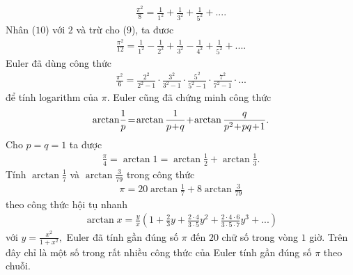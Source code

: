 \begin{multicols}{2}
	\begin{align*}
		\frac{{{\pi ^2}}}{8} = \frac{1}{{{1^2}}} + \frac{1}{{{3^2}}} + \frac{1}{{{5^2}}} + .... \tag{$10$}
	\end{align*}
	Nhân ($10$) với $2$ và trừ cho ($9$), ta đươc
	\begin{align*}
		\frac{{{\pi ^2}}}{{12}} = \frac{1}{{{1^2}}} - \frac{1}{{{2^2}}} + \frac{1}{{{3^2}}} - \frac{1}{{{4^2}}} + \frac{1}{{{5^2}}} + ....
	\end{align*}
	Euler đã dùng công thức
	\begin{align*}
		\frac{\pi^2}{6} = \frac{2^2}{2^2 - 1} \cdot \frac{3^2}{3^2 - 1} \cdot \frac{5^2}{5^2 - 1} \cdot \frac{7^2}{7^2 - 1} \cdot ...
	\end{align*}
	để tính logarithm của $\pi$.
	\vskip 0.1cm  
	Euler cũng đã chứng minh công thức
	\begin{align*}
		{\rm{arctan}}\frac{1}{p}\! =\! \arctan \frac{1}{{p \!+\! q}} \!+\! \arctan \frac{q}{{{p^2} \!+\! pq \!+\! 1}}.
	\end{align*}
	Cho $p = q = 1$ ta được 
	\begin{align*}
		\frac{\pi }{4} = \arctan 1 = \arctan \frac{1}{2} + \arctan \frac{1}{3}.
	\end{align*}
	Tính $\arctan \frac{1}{7}$  và  $\arctan \frac{3}{{79}}$ trong công thức
	\begin{align*}
		\pi  = 20\arctan \frac{1}{7} + 8\arctan \frac{3}{{79}}
	\end{align*}
	theo công thức hội tụ nhanh
	\begin{align*}
		\arctan x \!=\! \frac{y}{x}\left( {1 \!+\! \frac{2}{3}y \!+\! \frac{{2 \!\cdot\! 4}}{{3 \!\cdot\! 5}}{y^2} \!+\! \frac{{2 \!\cdot \!4 \!\cdot\! 6}}{{3 \!\cdot\! 5 \!\cdot\! 7}}{y^3} \!+\! ...} \right)
	\end{align*}
	với $y = \frac{{{x^2}}}{{1 + {x^2}}},$  Euler đã tính gần đúng số $\pi$  đến $20$ chữ số trong vòng $1$ giờ.
	\vskip 0.1cm
	Trên đây chỉ là một số trong rất nhiều công thức của Euler tính gần đúng số $\pi$  theo chuỗi.

\end{multicols}
